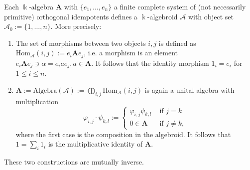 \begin{proposition}\label{prop:Alg-Alg-Correspondence}
Each $\Bbbk$-algebra $\mathbf{A}$ with $\{e_{1},\dots,e_{n}\}$ a finite complete system of (not necessarily primitive) orthogonal
idempotents defines a $\Bbbk$-algebroid $\mathcal{A}$ with object set $\mathcal{A}_{0} := \{1,\dots,n\}$. More precisely:
\begin{enumerate}
\renewcommand{\labelenumi}{(\theenumi)}
\item The set of morphisms between two objects $i,j$ is defined as
$\mathrm{Hom}_{\mathcal{A}}(i,j) := e_{i}\mathbf{A}e_{j}$, i.e. a morphism is an element
$e_{i}\mathbf{A}e_{j} \ni \alpha = e_{i}ae_{j}, a\in \mathbf{A}$.
It follows that the identity morphism $1_{i} = e_{i}$ for $1\leq i \leq n$.

\item $\mathbf{A} := \mathrm{Algebra}(\mathcal{A}) := \bigoplus_{i,j} \mathrm{Hom}_{\mathcal{A}}(i,j)$ is again a unital algebra with
multiplication 
\[
\varphi_{i,j} \cdot \psi_{k,l} := \begin{cases}\varphi_{i,j} \psi_{k,l} & \text{ if } j = k\\
0 \in \mathbf{A} & \text{ if } j \neq k, \end{cases}
\]
where the first case is the composition in the algebroid. It follows that $1 = \sum_{i} 1_{i}$ is the multiplicative identity of $\mathbf{A}$.

\end{enumerate}
These two constructions are mutually inverse.
\end{proposition}
